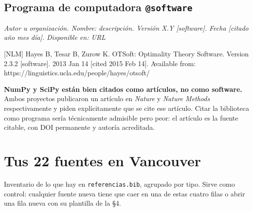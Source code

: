 \documentclass[11pt,a4paper]{article}
\newcommand{\refv}[1]{\par{\small #1}\par}
\newcommand{\plantilla}[1]{\par{\small\itshape\color{tinta} #1}\par}
\newcommand{\anot}[1]{{\color{gris}\footnotesize #1}}
\begin{document}
\subsection*{Programa de computadora \hfill \normalfont\small\texttt{@software}}
\plantilla{Autor u organización. Nombre: descripción. Versión X.Y [software]. Fecha [citado
año mes día]. Disponible en: URL}
\refv{\anot{[NLM]} Hayes B, Tesar B, Zurow K. OTSoft: Optimality Theory Software. Version
2.3.2 [software]. 2013 Jan 14 [cited 2015 Feb 14]. Available from:
https://linguistics.ucla.edu/people/hayes/otsoft/}

\begin{nota}
\textbf{NumPy y SciPy están bien citados como artículos, no como software.} Ambos proyectos
publicaron un artículo en \emph{Nature} y \emph{Nature Methods} respectivamente y piden
explícitamente que se cite ese artículo. Citar la biblioteca como programa sería
técnicamente admisible pero peor: el artículo es la fuente citable, con DOI permanente y
autoría acreditada.
\end{nota}

\section{Tus 22 fuentes en Vancouver}

Inventario de lo que hay en \texttt{referencias.bib}, agrupado por tipo. Sirve como control:
cualquier fuente nueva tiene que caer en una de estas cuatro filas o abrir una fila nueva con
su plantilla de la §4.
\end{document}
